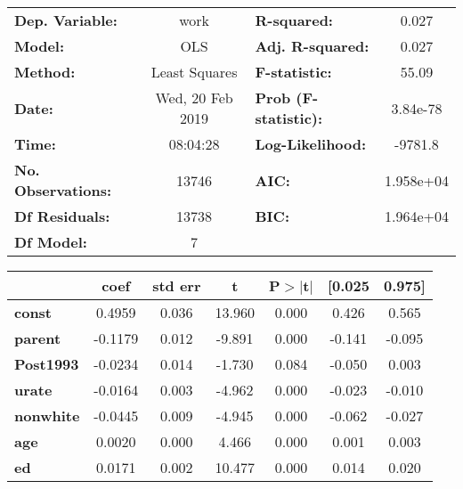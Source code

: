 
\begin{center}
\begin{tabular}{lclc}
\toprule
\textbf{Dep. Variable:}    &       work       & \textbf{  R-squared:         } &     0.027   \\
\textbf{Model:}            &       OLS        & \textbf{  Adj. R-squared:    } &     0.027   \\
\textbf{Method:}           &  Least Squares   & \textbf{  F-statistic:       } &     55.09   \\
\textbf{Date:}             & Wed, 20 Feb 2019 & \textbf{  Prob (F-statistic):} &  3.84e-78   \\
\textbf{Time:}             &     08:04:28     & \textbf{  Log-Likelihood:    } &   -9781.8   \\
\textbf{No. Observations:} &       13746      & \textbf{  AIC:               } & 1.958e+04   \\
\textbf{Df Residuals:}     &       13738      & \textbf{  BIC:               } & 1.964e+04   \\
\textbf{Df Model:}         &           7      & \textbf{                     } &             \\
\bottomrule
\end{tabular}
\begin{tabular}{lcccccc}
                  & \textbf{coef} & \textbf{std err} & \textbf{t} & \textbf{P$>$$|$t$|$} & \textbf{[0.025} & \textbf{0.975]}  \\
\midrule
\textbf{const}    &       0.4959  &        0.036     &    13.960  &         0.000        &        0.426    &        0.565     \\
\textbf{parent}   &      -0.1179  &        0.012     &    -9.891  &         0.000        &       -0.141    &       -0.095     \\
\textbf{Post1993} &      -0.0234  &        0.014     &    -1.730  &         0.084        &       -0.050    &        0.003     \\
\textbf{urate}    &      -0.0164  &        0.003     &    -4.962  &         0.000        &       -0.023    &       -0.010     \\
\textbf{nonwhite} &      -0.0445  &        0.009     &    -4.945  &         0.000        &       -0.062    &       -0.027     \\
\textbf{age}      &       0.0020  &        0.000     &     4.466  &         0.000        &        0.001    &        0.003     \\
\textbf{ed}       &       0.0171  &        0.002     &    10.477  &         0.000        &        0.014    &        0.020     \\

\end{tabular}
\end{center}
